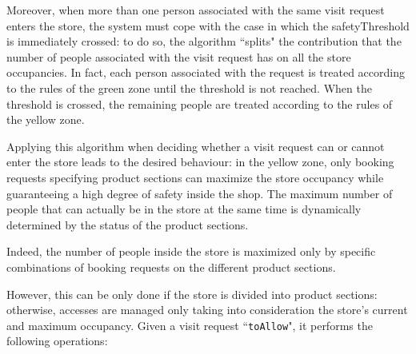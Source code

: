 \documentclass[a4paper,oneside,11pt]{book}
\begin{document}
    Moreover, when more than one person associated with the same visit request enters the store, the system must cope with the case in which the safetyThreshold is immediately crossed: to do so, the algorithm ``splits" the contribution that the number of people associated with the visit request has on all the store occupancies. In fact, each person associated with the request is treated according to the rules of the green zone until the threshold is not reached. When the threshold is crossed, the remaining people are treated according to the rules of the yellow zone. \par
    Applying this algorithm when deciding whether a visit request can or cannot enter the store leads to the desired behaviour: in the yellow zone, only booking requests specifying product sections can maximize the store occupancy while guaranteeing a high degree of safety inside the shop. The maximum number of people that can actually be in the store at the same time is dynamically determined by the status of the product sections. \par 
    Indeed, the number of people inside the store is maximized only by specific combinations of booking requests on the different product sections. \par
    However, this can be only done if the store is divided into product sections: otherwise, accesses are managed only taking into consideration the store’s current and maximum occupancy. \newpage
    Given a visit request ``\texttt{toAllow}", it performs the following operations:
\end{document}
